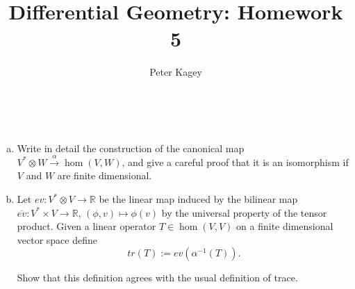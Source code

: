\documentclass{article}
\newenvironment{problem}[2][Problem]{\begin{trivlist}
\item[\hskip \labelsep {\bfseries #1}\hskip \labelsep {\bfseries #2.}]}{\end{trivlist}}
\begin{document}
\title{Differential Geometry: Homework 5}
\author{Peter Kagey}

\maketitle

\begin{problem}{1} \text{} \\
  \begin{enumerate}[(a)]
    \item  Write in detail the construction of the canonical map
      $V^* \otimes W \xrightarrow{\alpha} \hom(V, W)$,
      and give a careful proof that it is an isomorphism if $V$ and $W$ are
      finite dimensional.
    \item Let $ev: V^* \otimes V \rightarrow \mathbb{R}$ be the linear map
    induced by the bilinear map
    $\overline{ev}\colon V^* \times V \rightarrow \mathbb{R}$,
    $(\phi, v) \mapsto \phi(v)$ by the universal property of the tensor product.
    Given a linear operator $T \in \hom(V, V)$ on a finite dimensional vector
    space define \[
      tr(T) := ev(\alpha^{-1}(T)).
    \]

    Show that this definition agrees with the usual definition of trace.
  \end{enumerate}
\end{problem}
\end{document}
